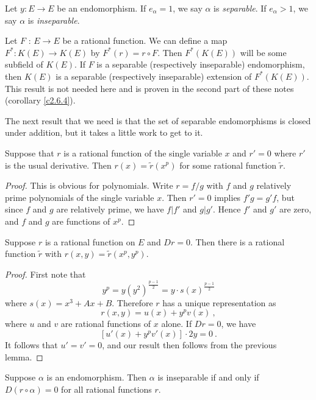 \begin{defi}
\label{d12.6}
Let $y: E\rightarrow E$ be an endomorphism. If $e_{\alpha}=1$, we say $\alpha$ is {\it separable}. If $e_{\alpha}>1$, we say $\alpha$ is {\it inseparable}.
\end{defi}

\rem
Let $F$ : $E\rightarrow E$ be a rational function. We can define a map $F^{*}: K(E)\rightarrow K(E)$ by $F^{*}(r)=r\circ F$. Then $F^{*}(K(E))$ will be some subfield of $K(E)$. If $F$ is a separable (respectively inseparable) endomorphism, then $K(E)$ is a separable (respectively inseparable) extension of $F^{*}(K(E))$. This result is not needed here and is proven in the second part of these notes (corollary \ref{c2.6.4}).

\bigskip
The next result that we need is that the set of separable endomorphisms is closed under addition, but it takes a little work to get to it.
\begin{lem}
\label{l12.7}
Suppose that $r$ is a rational function of the single variable $x$ and $r'=0$ where $r'$ is the usual derivative. Then $r(x)=\tilde{r}(x^{p})$ for some rational function $\tilde{r}$.
\end{lem}

\begin{proof}
This is obvious for polynomials. Write $r=f/g$ with $f$ and $g$ relatively prime polynomials of the single variable $x$. Then $r'=0$ implies $f'g=g'f$, but since $f$ and $g$ are relatively prime, we have $f|f'$ and $g|g'$. Hence $f'$ and $g'$ are zero, and $f$ and $g$ are functions of $x^{p}$.
\end{proof}

\begin{prop}
\label{p12.8}
Suppose $r$ is a rational function on $E$ and $Dr=0$. Then there is a rational function $\tilde{r}$ with $r(x, y)=\tilde{r}(x^{p},y^{p})$.
\end{prop}

\begin{proof}
First note that
$$
y^{p}=y(y^{2})^{\frac{p-1}{2}}=y\cdot s(x)^{\frac{p-1}{2}}
$$
where $s(x)=x^{3}+Ax+B$. Therefore $r$ has a unique representation as
$$
r(x, y)=u(x)+y^{p}v(x)\ ,
$$
where $u$ and $v$ are rational functions of $x$ alone. If $Dr=0$, we have
$$
[u'(x)+y^{p}v'(x)]\cdot 2y=0\ .
$$
It follows that $u'=v'=0$, and our result then follows from the previous lemma.
\end{proof}

\begin{prop}
\label{p12.9}
Suppose $\alpha$ is an endomorphism. Then $\alpha$ is inseparable if and only if $D(r\circ\alpha)=0$ for all rational functions $r$.
\end{prop}

